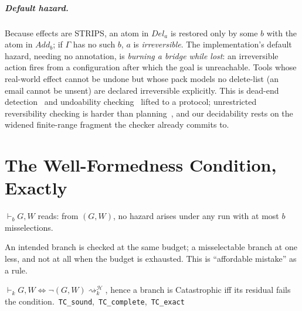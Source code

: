 \documentclass[a4paper,UKenglish,cleveref,autoref,thm-restate,anonymous]{lipics-v2021}
\newcommand{\Add}{\mathit{Add}}
\newcommand{\Del}{\mathit{Del}}
\newcommand{\End}{\mathsf{End}}
\newcommand{\Haz}{\mathcal H}
\newcommand{\safeT}[1]{\vdash_{#1}}
\newcommand{\reachh}[1]{\rightsquigarrow^{\Haz}_{#1}}
\newcommand{\Cat}{\textsf{Catastrophic}}
\newcommand{\coqok}[1]{\textcolor{okgreen}{\ding{51}}\,\texttt{\small #1}}
\begin{document}
\subparagraph*{Default hazard.}
Because effects are STRIPS, an atom in $\Del_a$ is restored only by some $b$
with the atom in $\Add_b$; if $\Gamma$ has no such $b$, $a$ is
\emph{irreversible}. The implementation's default hazard, needing no
annotation, is \emph{burning a bridge while lost}: an irreversible action
fires from a configuration after which the goal is unreachable. Tools whose
real-world effect cannot be undone but whose pack models no delete-list (an
email cannot be unsent) are declared irreversible explicitly. This is dead-end
detection~\cite{steinmetz-aaai16} and undoability
checking~\cite{daum-icaps16} lifted to a protocol; unrestricted reversibility
checking is harder than planning~\cite{morak-kr25}, and our decidability rests
on the widened finite-range fragment the checker already commits to.

\section{The Well-Formedness Condition, Exactly}\label{sec:typing}

$\safeT{b} G , W$ reads: from $(G,W)$, no hazard arises under any run with at
most $b$ misselections.
An intended branch is checked at the same budget; a misselectable branch at
one less, and not at all when the budget is exhausted. This is ``affordable
mistake'' as a rule.

\begin{theorem}\label{thm:exact}
$\safeT{k} G,W \iff \neg (G,W)\reachh{k}$, hence a branch is \Cat{} iff its
residual fails the condition. \coqok{TC\_sound}, \coqok{TC\_complete},
\coqok{TC\_exact}
\end{theorem}
\end{document}
